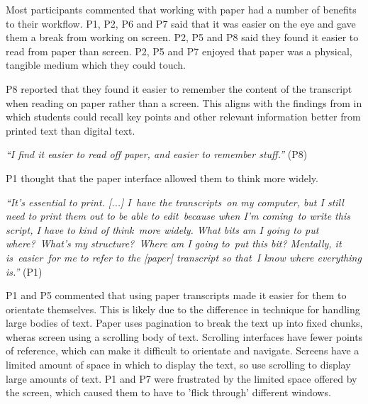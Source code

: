 
Most participants commented that working with paper had a number of benefits to their workflow. P1, P2, P6 and P7 said
that it was easier on the eye and gave them a break from working on screen. P2, P5 and P8 said they found it easier to
read from paper than screen. P2, P5 and P7 enjoyed that paper was a physical, tangible medium which they could touch.

P8 reported that they found it easier to remember the content of the transcript when reading on paper rather than a
screen.  This aligns with the findings from \citet{Singer2017} in which students could recall key points and other
relevant information better from printed text than digital text.




\textit{``I find it easier to read off paper, and easier to remember stuff.''} (P8)

P1 thought that the paper interface allowed them to think more widely.

\textit{``It's essential to print. [...]
I have the transcripts on my computer, but I still need to print them out to be able to edit because when I'm
coming to write this script, I have to kind of think more widely. What bits am I going to put where? What's my
structure? Where am I going to put this bit? Mentally, it is easier for me to refer to the [paper] transcript so
that I know where everything is.''} (P1)


P1 and P5 commented that using paper transcripts made it easier for them to orientate themselves. This is likely due to
the difference in technique for handling large bodies of text. Paper uses pagination to break the text up into fixed
chunks, wheras screen using a scrolling body of text. Scrolling interfaces have fewer points of reference, which can
make it difficult to orientate and navigate.
Screens have a limited amount of space in which to display the text, so use scrolling to display large amounts of text.
P1 and P7 were frustrated by the limited space offered by the screen, which caused them to have to 'flick through'
different windows.

